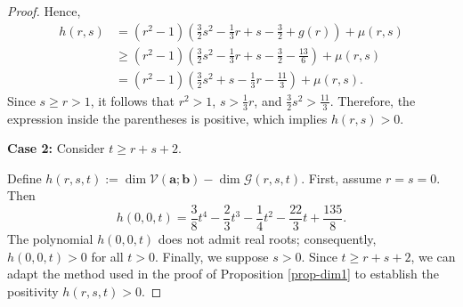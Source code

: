 \documentclass[twoside,reqno]{amsart}
\theoremstyle{plain}
\begin{document}
\begin{proof}
Hence,
\[
\begin{aligned}
h(r,s) & = (r^2 - 1)\left( \frac{3}{2}s^{2} - \frac{1}{3}r + s - \frac{3}{2} + g(r) \right) + \mu(r,s) \\
& \geq (r^2 - 1)\left( \frac{3}{2}s^{2} - \frac{1}{3}r + s - \frac{3}{2} - \frac{13}{6} \right) + \mu(r,s) \\
& = (r^2 - 1)\left( \frac{3}{2}s^{2} + s - \frac{1}{3}r - \frac{11}{3} \right) + \mu(r,s) .
\end{aligned}
\]
Since \( s \geq r > 1 \), it follows that \( r^2 > 1 \), \( s > \frac{1}{3}r \), and \( \frac{3}{2}s^2 > \frac{11}{3} \). Therefore, 
the expression inside the parentheses is positive, which implies \( h(r,s) > 0 \).

\textbf{Case 2:} Consider \( t \geq r + s + 2 \).

Define \( h(r,s,t) := \dim \mathcal{V}(\boldsymbol{a};\boldsymbol{b}) - \dim \mathcal{G}(r,s,t) \).  
First, assume \( r = s = 0 \). Then
\[
h(0,0,t) = \frac{3}{8}t^4 - \frac{2}{3}t^3 - \frac{1}{4}t^2 - \frac{22}{3}t + \frac{135}{8}.
\]
The polynomial \( h(0,0,t) \) does not admit real roots; consequently, \( h(0,0,t) > 0 \) for all  
\( t>0 \). Finally, we suppose \( s > 0 \). Since \( t \geq r + s + 2 \),  we can adapt the method used 
in the proof of Proposition \ref{prop-dim1} to establish the positivity \( h(r,s,t) > 0 \).
\end{proof}
\end{document}
